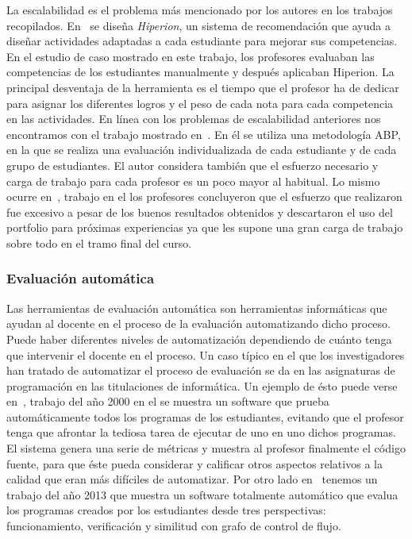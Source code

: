 La escalabilidad es el problema más mencionado por los autores en los trabajos recopilados. En~\cite{serrano2013hiperion} se diseña \emph{Hiperion}, un sistema de recomendación que ayuda a diseñar actividades adaptadas a cada estudiante para mejorar sus competencias. En el estudio de caso mostrado en este trabajo, los profesores evaluaban las competencias de los estudiantes manualmente y después aplicaban Hiperion. La principal desventaja de la herramienta es el tiempo que el profesor ha de dedicar para asignar los diferentes logros y el peso de cada nota para cada competencia en las actividades. En línea con los problemas de escalabilidad anteriores nos encontramos con el trabajo mostrado en~\cite{lacuesta2009active}. En él se utiliza una metodología ABP, en la que se realiza una evaluación individualizada de cada estudiante y de cada grupo de estudiantes. El autor considera también que el esfuerzo necesario y carga de trabajo para cada profesor es un poco mayor al habitual. Lo mismo ocurre en~\cite{benlloch2007adapting}, trabajo en el los profesores concluyeron que el esfuerzo que realizaron fue excesivo a pesar de los buenos resultados obtenidos y descartaron el uso del portfolio para próximas experiencias ya que les supone una gran carga de trabajo sobre todo en el tramo final del curso.

\subsubsection{Evaluación automática}

Las herramientas de evaluación automática son herramientas informáticas que ayudan al docente en el proceso de la evaluación automatizando dicho proceso. Puede haber diferentes niveles de automatización dependiendo de cuánto tenga que intervenir el docente en el proceso. Un caso típico en el que los investigadores han tratado de automatizar el proceso de evaluación se da en las asignaturas de programación en las titulaciones de informática. Un ejemplo de ésto puede verse en~\cite{jackson2000semi}, trabajo del año 2000 en el se muestra un software que prueba automáticamente todos los programas de los estudiantes, evitando que el profesor tenga que afrontar la tediosa tarea de ejecutar de uno en uno dichos programas. El sistema genera una serie de métricas y muestra al profesor finalmente el código fuente, para que éste pueda considerar y calificar otros aspectos relativos a la calidad que eran más difíciles de automatizar. Por otro lado en~\cite{vujovsevic2013software} tenemos un trabajo del año 2013 que muestra un software totalmente automático que evalua los programas creados por los estudiantes desde tres perspectivas: funcionamiento, verificación y similitud con grafo de control de flujo.

